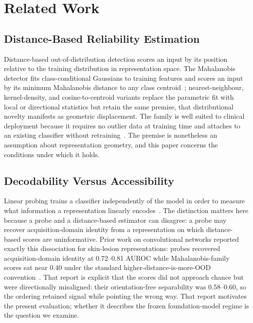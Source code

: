 \section{Related Work}

\subsection{Distance-Based Reliability Estimation}

Distance-based out-of-distribution detection scores an input by its position
relative to the training distribution in representation space. The
Mahalanobis detector fits class-conditional Gaussians to training features
and scores an input by its minimum Mahalanobis distance to any class
centroid~\cite{lee2018simple}; nearest-neighbour, kernel-density, and
cosine-to-centroid variants replace the parametric fit with local or
directional statistics but retain the same premise, that distributional
novelty manifests as geometric displacement. The family is well suited to
clinical deployment because it requires no outlier data at training time and
attaches to an existing classifier without retraining~\cite{lee2018simple}.
The premise is nonetheless an assumption about representation geometry, and
this paper concerns the conditions under which it holds.

\subsection{Decodability Versus Accessibility}

Linear probing trains a classifier independently of the model in order to
measure what information a representation linearly
encodes~\cite{alain2016probes}. The distinction matters here because a
probe and a distance-based estimator can disagree: a probe may recover
acquisition-domain identity from a representation on which distance-based
scores are uninformative. Prior work on convolutional networks reported exactly this dissociation for
skin-lesion representations: probes recovered acquisition-domain identity at
0.72--0.81 AUROC while Mahalanobis-family scores sat near 0.40 under the
standard higher-distance-is-more-OOD convention~\cite{tran2026decodable}.
That report is explicit that the scores did not approach chance but were
directionally misaligned: their orientation-free separability was 0.58--0.60,
so the ordering retained signal while pointing the wrong way. That report motivates the
present evaluation; whether it describes the frozen foundation-model regime
is the question we examine.

